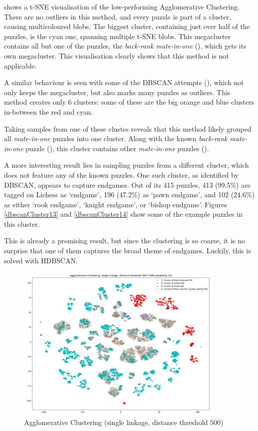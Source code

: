  shows a t-SNE visualisation of the low-performing Agglomerative
Clustering. There are no outliers in this method, and every puzzle is part of a
cluster, causing multicoloured blobs. The biggest cluster, containing just over
half of the puzzles, is the cyan one, spanning multiple t-SNE blobs. This
megacluster contains all but one of the puzzles, the \emph{back-rank
mate-in-one} (), which gets its own megacluster. This
visualisation clearly shows that this method is not applicable.

A similar behaviour is seen with some of the DBSCAN attempts (),
which not only keeps the megacluster, but also marks many puzzles as outliers.
This method creates only 6 clusters: some of these are the big orange and blue
clusters in-between the red and cyan.

Taking samples from one of these clustes reveals that this method likely
grouped all \emph{mate-in-one} puzzles into one cluster. Along with the known
\emph{back-rank mate-in-one} puzzle (), this cluster contains
other \emph{mate-in-one} puzzles ().

A more interesting result lies in sampling puzzles from a different cluster,
which does not feature any of the known puzzles. One such cluster, as
identified by DBSCAN, appears to capture endgames. Out of its 415 puzzles, 413
(99.5\%) are tagged on Lichess as `endgame', 196 (47.2\%) as `pawn endgame',
and 102 (24.6\%) as either `rook endgame', `knight endgame', or `bishop
endgame'. Figures \ref{dbscanCluster13} and \ref{dbscanCluster14} show some of
the example puzzles in this cluster.

This is already a promising result, but since the clustering is so coarse, it
is no surprise that one of them captures the broad theme of endgames. Luckily,
this is solved with HDBSCAN.

\begin{figure}[H]
  \centering
  \includegraphics[width=0.9\textwidth]{project/img/tsne/ac_25.png}
  \caption{Agglomerative Clustering (single linkage, distance threshold $500$)}
  \label{tsne1}
\end{figure}

